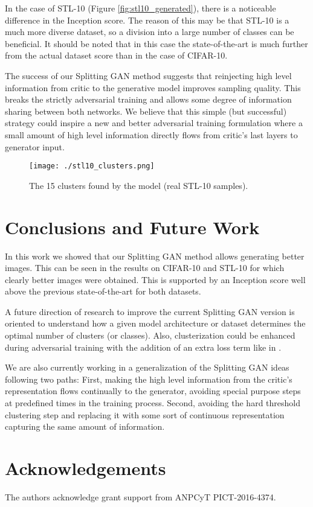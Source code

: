 \documentclass[times,twocolumn]{article}
\begin{document}
In the case of STL-10 (Figure \ref{fig:stl10_generated}), there is a noticeable difference in the Inception score. The reason of this may be that STL-10 is a much more diverse dataset, so a division into a large number of classes can be beneficial. It should be noted that in this case the state-of-the-art is much further from the actual dataset score than in the case of CIFAR-10.

The success of our Splitting GAN method suggests that reinjecting high level information from critic to the generative model improves sampling quality. This breaks the strictly adversarial training and allows some degree of information sharing between both networks. We believe that this simple (but successful) strategy could inspire a new and better adversarial training formulation where a small amount of high level information directly flows from critic’s last layers to generator input.  



\begin{figure}
 \centering
 \texttt{[image: ./stl10\_clusters.png]}
\caption{The 15 clusters found by the model (real STL-10 samples).}
\label{fig:stl10_clusters}
\end{figure}

 
\section{Conclusions and Future Work}
In this work we showed that our Splitting GAN method allows generating better images. This can be seen in the results on CIFAR-10 and STL-10 for which clearly better images were obtained. This is supported by an Inception score well above the previous state-of-the-art for both datasets. 

A future direction of research to improve the current Splitting GAN version is oriented to understand how a given model architecture or dataset determines the optimal number of clusters (or classes). Also, clusterization could be enhanced during adversarial training with the addition of an extra loss term like in \cite{Wen2016}.

We are also currently working in a generalization of the Splitting GAN ideas following two paths: First, making the high level information from the critic's representation flows continually to the generator, avoiding special purpose steps at predefined times in the training process. Second, avoiding the hard threshold clustering step and replacing it with some sort of continuous representation capturing the same amount of information.
\section{Acknowledgements}
The authors acknowledge grant support from ANPCyT PICT-2016-4374.



\end{document}
